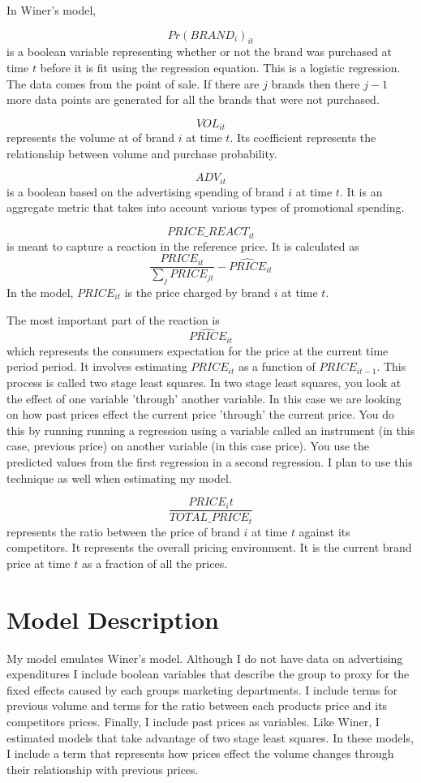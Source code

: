 \documentclass{article}
\begin{document}
In Winer's model,

$${Pr(BRAND_i)}_{it} $$ is a boolean variable representing whether or not the brand was purchased at time $t$ before it is fit using the regression equation. This is a logistic regression. The data comes from the point of sale. If there are $j$ brands then there $j-1$ more data points are generated for all the brands that were not purchased.

$$VOL_{it}$$ represents the volume at of brand $i$ at time $t$. Its coefficient represents the relationship between volume and purchase probability.

$$ADV_{it}$$ is a boolean based on the advertising spending of brand $i$ at time $t$. It is an aggregate metric that takes into account various types of promotional spending.

$$PRICE\_REACT_{it}$$ is meant to capture a reaction in the reference price. It is calculated as $$\dfrac{PRICE_{it}} {\sum_j PRICE_{jt}} - \widehat{PRICE}_{it}$$ In the model, ${PRICE}_{it}$ is the price charged by brand $i$ at time $t$. 

The most important part of the reaction is $$\widehat{PRICE}_{it}$$ which represents the consumers expectation for the price at the current time period period. It involves estimating ${PRICE}_{it}$ as a function of ${PRICE}_{it-1}$. This process is called two stage least squares. In two stage least squares, you look at the effect of one variable 'through' another variable.  In this case we are looking on how past prices effect the current price 'through' the current price. You do this by running running a regression using a variable called an instrument (in this case, previous price) on another variable (in this case price). You use the predicted values from the first regression in a second regression.  I plan to use this technique as well when estimating my model.

$$ \dfrac{PRICE_it}{TOTAL\_PRICE_{t}}$$ represents the ratio between the price of brand $i$ at time $t$ against its competitors. It represents the overall pricing environment. It is the current brand price at time $t$ as a fraction of all the prices.

\section{Model Description}

My model emulates Winer's model. Although I do not have data on advertising expenditures I include boolean variables that describe the group to proxy for the fixed effects caused by each groups marketing departments. I include terms for previous volume and terms for the ratio between each products price and its competitors prices. Finally, I include past prices as variables. Like Winer, I estimated models that take advantage of two stage least squares. In these models, I include a term that represents how prices effect the volume changes through their relationship with previous prices. 
\end{document}
